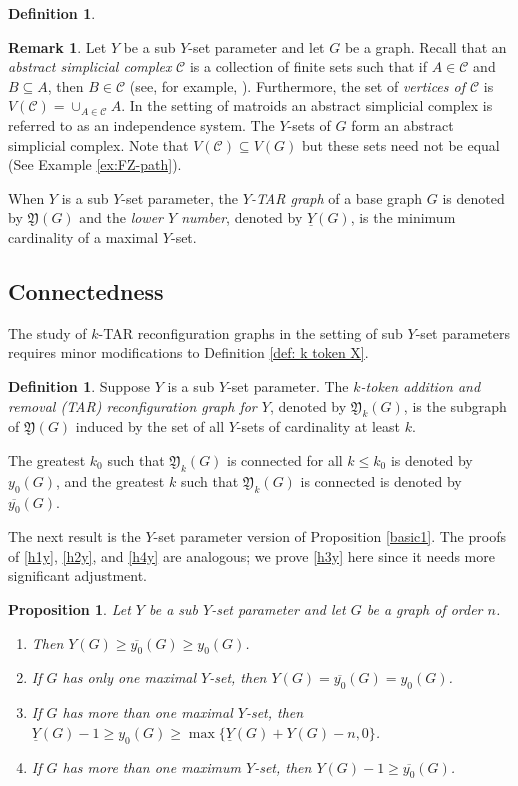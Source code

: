 \documentclass{article}
\numberwithin{figure}{section}
\numberwithin{table}{section}
\numberwithin{equation}{section}
\newtheorem{prop}[thm]{Proposition}
\theoremstyle{definition}
\newtheorem{rem}[thm]{Remark}
\theoremstyle{definition}
\newtheorem{defn}[thm]{Definition}
\theoremstyle{definition}
\newcommand{\ben}{\begin{enumerate}}
\newcommand{\een}{\end{enumerate}}
\newcommand{\ytar}{\mathfrak{Y}}
\newcommand{\yyo}{y_0}
\newcommand{\ulyo}{\overline{y_0}}
\newcommand{\ybar}{\underline{Y}}
\begin{document}
{\begin{defn}
\begin{rem} 
Let $Y$ be a sub $Y$-set parameter and let $G$ be a  graph. Recall that an \emph{abstract simplicial complex} $\mathcal{C}$ is a collection of finite sets such that if $A\in \mathcal{C}$ and $B\subseteq A$, then $B\in\mathcal{C}$ (see, for example, \cite[Definition 4.1.2]{Hal22}).  Furthermore, the set of \emph{vertices of $\mathcal{C}$} is $V(\mathcal{C})=\cup_{A\in \mathcal{C}}A$. In the setting of matroids an abstract simplicial complex is referred to as an independence system. The $Y$-sets of $G$ form an abstract simplicial complex.    Note that $V(\mathcal{C})\subseteq V(G)$ but these sets need not be equal (See Example \ref{ex:FZ-path}).
\end{rem}

When $Y$ is a sub $Y$-set parameter, the {\em $Y$-TAR graph}  of a base graph  $G$ is denoted by  $\ytar(G)$  and the \emph{lower $Y$ number}, denoted by  $\ybar(G)$, is the minimum cardinality of a maximal $Y$-set.
\end{defn}



\subsection{Connectedness}\label{ss:Yconnect}

 The study of $k$-TAR reconfiguration graphs in the setting of sub $Y$-set parameters requires minor modifications to Definition \ref{def: k token X}.
 
\begin{defn}  Suppose $Y$ is a  sub $Y$-set parameter.      The \emph{$k$-token addition and removal (TAR) reconfiguration graph for $Y$}, denoted by $\ytar_k(G)$, is the subgraph of $\ytar(G)$ induced by the set of all  $Y$-sets of cardinality at least $k$. 

The greatest $k_0$ such that $\ytar_k(G)$ is connected for all $k\le k_0$ is denoted by $\yyo(G)$, and the greatest $k$ such that $\ytar_k(G)$ is connected is denoted by $\ulyo(G)$.
\end{defn}

 The next result is the $Y$-set parameter version of Proposition \ref{basic1}. The proofs of \eqref{h1y}, \eqref{h2y}, and \eqref{h4y} are analogous; we prove \eqref{h3y} here since it needs more significant adjustment. 

 
\begin{prop}\label{Ybasic1}
    Let  $Y$ be a  sub $Y$-set parameter and let $G$ be a graph of order $n$.
    \ben[$(1)$]
    \item\label{h1y} Then $Y(G)\ge \ulyo(G)\ge\yyo(G)$.
    \item\label{h2y} If $G$ has only one maximal $Y$-set, then $Y(G)=\ulyo(G)=\yyo(G)$.
    \item\label{h3y} If $G$ has more than one  maximal $Y$-set, then 
    $\ybar(G)-1 \ge \yyo(G)\ge\max\{\ybar(G)+Y(G)-n,0\}$.
    \item\label{h4y} If $G$ has more than one  maximum $Y$-set, then 
    $Y(G)-1\ge \ulyo(G)$.
    \een
\end{prop}

}
\end{document}
